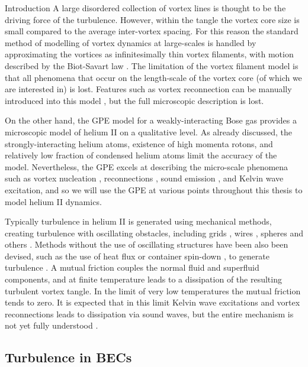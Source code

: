 \begin{chapter}{\label{cha:bose_gases}Introduction}
A large disordered collection of vortex lines is thought to be the driving force of the turbulence. However, within the tangle the vortex core size is small compared to the average inter-vortex spacing. For this reason the standard method of modelling of vortex dynamics at large-scales is handled by approximating the vortices as infinitesimally thin vortex filaments, with motion described by the Biot-Savart law \cite{barenghi_donnelly_01}. The limitation of the vortex filament model is that all phenomena that occur on the length-scale of the vortex core (of which we are interested in) is lost. Features such as vortex reconnection can be manually introduced into this model \cite{barenghi_donnelly_01}, but the full microscopic description is lost.

On the other hand, the GPE model for a weakly-interacting Bose gas provides a microscopic model of helium II on a qualitative level. As already discussed, the strongly-interacting helium atoms, existence of high momenta rotons, and relatively low fraction of condensed helium atoms limit the accuracy of the model. Nevertheless, the GPE excels at describing the micro-scale phenomena such as vortex nucleation \cite{frisch92}, reconnections \cite{PhysRevLett.71.1375, PhysRevLett.76.4745}, sound emission \cite{leadbeater,PhysRevA.69.053601}, and Kelvin wave excitation, and so we will use the GPE at various points throughout this thesis to model helium II dynamics.

Typically turbulence in helium II is generated using mechanical methods, creating turbulence with oscillating obstacles, including grids \cite{Davis2000}, wires \cite{Guenault1986,Bradley2011,Fisher2001}, spheres \cite{Schoepe1995} and others \cite{Blaauwgeers2007,Bradley2012,Tabeling1998,Salort,VinenSkrbek2008}. Methods without the use of oscillating structures have been also been devised, such as the use of heat flux \cite{Vinen114} or container spin-down \cite{PhysRevLett.99.265302}, to generate turbulence . A mutual friction \cite{Donnelly} couples the normal fluid and superfluid components, and at finite temperature leads to a dissipation of the resulting turbulent vortex tangle. In the limit of very low temperatures the mutual friction tends to zero. It is expected that in this limit Kelvin wave excitations \cite{leadbeater,PhysRevA.69.053601} and vortex reconnections leads to dissipation via sound waves, but the entire mechanism is not yet fully understood \cite{PhysRevB.61.1410}.

\subsection{Turbulence in BECs}


\end{chapter}
